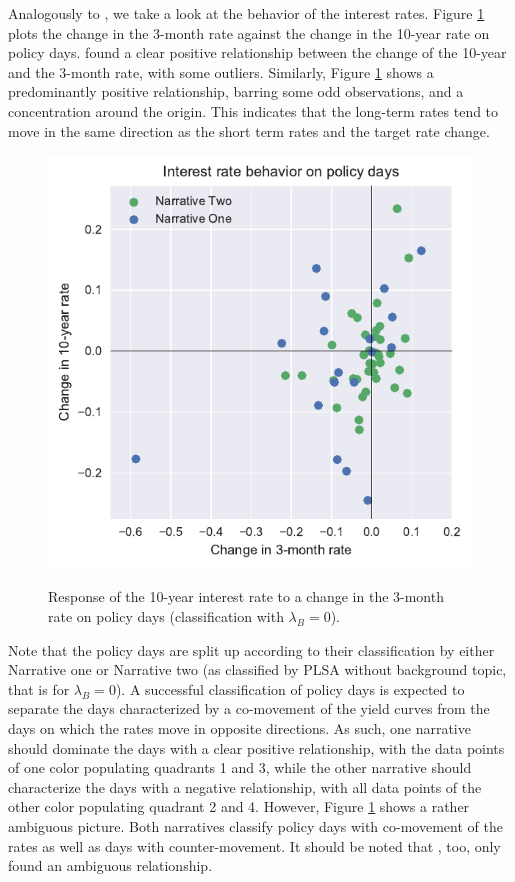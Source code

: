 \documentclass[11pt,a4paper,english,oneside]{book}
\numberwithin{equation}{chapter}
\begin{document}
Analogously to \citet[pp. 14 -- 15]{Ellingsen.2003}, we take a look at the behavior of the interest rates. Figure \ref{Change01} plots the change in the 3-month rate against the change in the 10-year rate on policy days. \citet[p. 14]{Ellingsen.2003} found a clear positive relationship between the change of the 10-year and the 3-month rate, with some outliers. Similarly, Figure \ref{Change01} shows a predominantly positive relationship, barring some odd observations, and a concentration around the origin. This indicates that the long-term rates tend to move in the same direction as the short term rates and the target rate change. 

\begin{figure}
	\caption{Response of the 10-year interest rate to a change in the 3-month rate on policy days (classification with $\lambda_B=0$).}
	\centering
	\includegraphics[scale=1]{Images/ChangePlot_L0_0.pdf}
	\label{Change01}
\end{figure}

Note that the policy days are split up according to their classification by either Narrative one or Narrative two (as classified by PLSA without background topic, that is for $\lambda_B=0$). A successful classification of policy days is expected to separate the days characterized by a co-movement of the yield curves from the days on which the rates move in opposite directions. As such, one narrative should dominate the days with a clear positive relationship, with the data points of one color populating quadrants 1 and 3, while the other narrative should characterize the days with a negative relationship, with all data points of the other color populating quadrant 2 and 4. However, Figure \ref{Change01} shows a rather ambiguous picture. Both narratives classify policy days with co-movement of the rates as well as days with counter-movement.  It should be noted that \citet[pp. 14--15]{Ellingsen.2003}, too, only found an ambiguous relationship.
\end{document}
